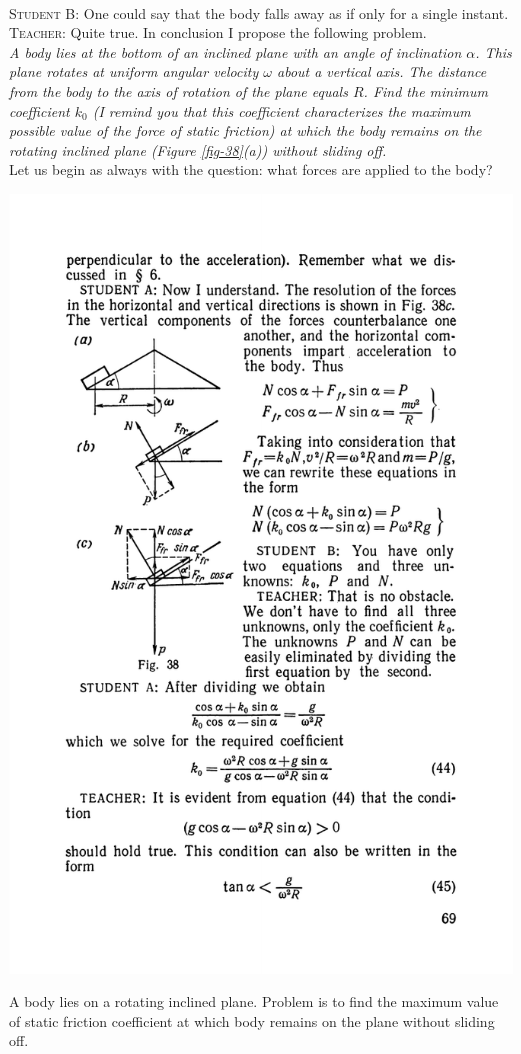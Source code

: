 \documentclass[a4paper,sfsidenotes]{tufte-book}
\begin{document}
\\
\textsc{Student B:} One could say that the body falls away as if only for a single instant.
\\
\textsc{Teacher:} Quite true. In conclusion I propose the following problem.\\
 \emph{A body lies at the bottom of an inclined plane with an angle of inclination $\alpha$. This plane rotates at uniform angular velocity $\omega$ about a vertical axis. The distance from the body to the axis of rotation of the plane equals $R$. Find the minimum coefficient $k_{0}$ (I remind you that this coefficient characterizes the maximum possible value of the force of static friction) at which the body remains on the rotating inclined plane (\emph{Figure \ref{fig-38}(a)}) without sliding off.}
 \\
 Let us begin as always with the question: what forces are applied to the body?
\\
\begin{marginfigure}[-6cm]
\centering
\includegraphics[width=\linewidth]{fig-038a.pdf}
\caption{A body lies on a rotating inclined plane. Problem is to find the maximum value of static friction coefficient at which body remains on the plane without sliding off.}
\label{fig-38}
\end{marginfigure}
\end{document}
